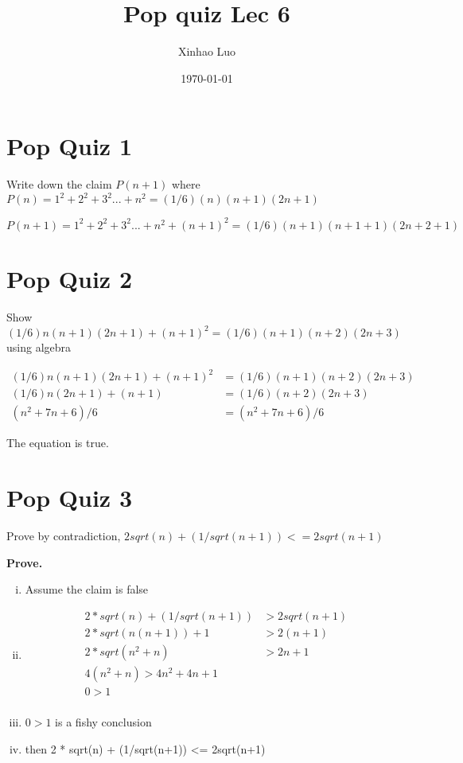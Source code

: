 \documentclass{article}
\title{\bf \Large Pop quiz Lec 6}
\author{Xinhao Luo}
\date{\today}
\def\math#1{$#1$}
\begin{document}
\maketitle
\medskip

\section{Pop Quiz 1}

Write down the claim \math{P(n + 1)} where \math{P(n) = 1^2 + 2^2 + 3^2... + n^2 = (1/6)(n)(n+1)(2n+1)}

\math{P(n+1) = 1^2 + 2^2 + 3^2... + n^2 + {(n+1)}^{2} = (1/6)(n+1)(n+1+1)(2n+2+1)}

\section{Pop Quiz 2}

Show \math{(1/6)n(n+1)(2n+1) + (n+1)^2 = (1/6)(n+1)(n+2)(2n+3)} using algebra

 \begin{equation}
    \begin{split}
        (1/6)n(n+1)(2n+1) + (n+1)^2 & = (1/6)(n+1)(n+2)(2n+3)\\
        (1/6)n(2n+1) + (n+1)  & = (1/6)(n+2)(2n+3) \\
        (n^2+7n+6)/6 &= (n^2+7n+6)/6
    \end{split}
\end{equation}

The equation is true.

\section{Pop Quiz 3}

Prove by contradiction, \math{2sqrt(n) + (1/sqrt(n+1)) <= 2sqrt(n+1)}

\textbf{Prove.}

\begin{enumerate}[i)]
    \item Assume the claim is false
    \item 
        \begin{equation}
            \begin{split}
                2 * sqrt(n) + (1/sqrt(n+1)) & > 2sqrt(n+1) \\
                2 * sqrt(n(n+1)) + 1 & > 2(n+1) \\ 
                2 * sqrt(n^2+n) & > 2n+1 \\
                4(n^2+n) > 4{n}^2 + 4n +1 \\
                0 > 1\\
            \end{split}
        \end{equation}
    \item \math{0 > 1} is a fishy conclusion
    \item then 2 * sqrt(n) + (1/sqrt(n+1)) <= 2sqrt(n+1)
\end{enumerate}
\end{document}
